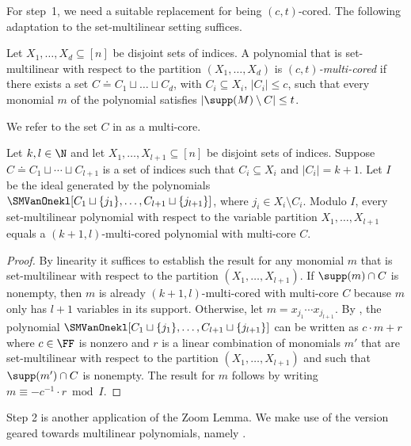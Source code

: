 \documentclass{toc}
\begin{document}
For step~1, we need a suitable replacement for being \((c,t)\)-cored.
The following adaptation to the set-multilinear setting
suffices.
\begin{definition}
  \label{def.smcored}
  Let \(X_1, \dots, X_d \subseteq [n]\) be disjoint sets of
  indices.
  A polynomial that is
  set-multilinear with respect to the partition $(X_1, \dots, X_d)$ is
  \emph{\((c,t)\)-multi-cored} if
  there exists a set $C\doteq C_1\sqcup\dots\sqcup C_d$, with $C_i\subseteq X_i$, $|C_i|\le c$,
  such that every monomial $m$ of the polynomial satisfies $|\supp(M)\setminus C|\le t$.
\end{definition}

We refer to the set $C$ in  as a multi-core.

\begin{lemma}
    \label{lemma.smvanone-multicoredform}
    Let $k,l\in\N$ and let $X_1, \dots, X_{l+1}\subseteq [n]$
    be disjoint sets of indices. Suppose $C\doteq C_1\sqcup\cdots\sqcup C_{l+1}$ is a set of indices
    such that $C_i\subseteq X_i$ and $|C_i| = k+1$. Let $I$ be the ideal generated by
    the polynomials $\SMVanOnekl[C_1\sqcup \{j_1\},\dots,C_{l+1}\sqcup \{j_{l+1}\}]$, 
    where $j_i\in X_i\setminus C_i$. Modulo $I$, every set-multilinear polynomial with respect to the variable partition
    \(X_1, \dots,X_{l+1}\) equals a \((k+1,l)\)-multi-cored polynomial with multi-core $C$.
\end{lemma}

\begin{proof}
    By linearity it suffices to establish the result for any 
    monomial $m$ that is set-multilinear with respect to the partition $(X_1, \dots, X_{l+1})$. 
    If $\supp(m) \cap C$ is nonempty, then $m$ is already $(k+1,l)$-multi-cored with multi-core $C$ because $m$ only has $l+1$ variables in its support. Otherwise, let $m=x_{j_1}\cdots x_{j_{l+1}}$. By , the polynomial $\SMVanOnekl[C_1\sqcup\{j_1\},\dots, C_{l+1}\sqcup\{j_{l+1}\}]$ can be written as $c \cdot m + r$ where $c \in \FF$ is nonzero and $r$ is a linear combination of monomials $m'$ that are set-multilinear with respect to the partition $(X_1, \dots, X_{l+1})$ and such that $\supp(m') \cap C$ is nonempty. The result for $m$ follows by writing $m \equiv -c^{-1} \cdot r \bmod I$.
\end{proof}

Step 2 is another application of the Zoom Lemma. We make use of the version geared towards multilinear polynomials, namely .
\end{document}
